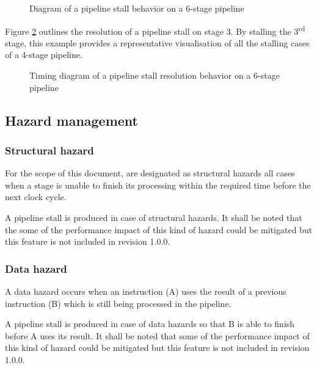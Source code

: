 \begin{figure}[H]
    \centering
    
    \caption{Diagram of a pipeline stall behavior on a 6-stage pipeline}
    \label{fig:pipeline-behavior-wait-stall}
\end{figure}

\begin{content}
    Figure \ref{fig:pipeline-behavior-wait-stall-resolution} outlines the resolution of a pipeline stall on stage 3. By stalling the 3\textsuperscript{rd} stage, this example provides a representative visualisation of all the stalling cases of a 4-stage pipeline.
\end{content}

\begin{figure}[H]
    \centering
    
    \caption{Timing diagram of a pipeline stall resolution behavior on a 6-stage pipeline}
    \label{fig:pipeline-behavior-wait-stall-resolution}
\end{figure}

\subsection{Hazard management}

\subsubsection{Structural hazard}

\begin{content}
    For the scope of this document, are designated as structural hazards all cases when a stage is unable to finish its processing within the required time before the next clock cycle.

    A pipeline stall is produced in case of structural hazards. It shall be noted that the some of the performance impact of this kind of hazard could be mitigated but this feature is not included in revision 1.0.0.
\end{content}

\subsubsection{Data hazard}

\begin{content}
    A data hazard occurs when an instruction (A) uses the result of a previous instruction (B) which is still being processed in the pipeline.

    A pipeline stall is produced in case of data hazards so that B is able to finish before A uses its result. It shall be noted that some of the performance impact of this kind of hazard could be mitigated but this feature is not included in revision 1.0.0.
\end{content}

